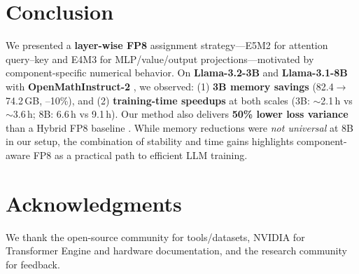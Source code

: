 \documentclass[conference]{IEEEtran}
\begin{document}
\section{Conclusion}

We presented a \textbf{layer-wise FP8} assignment strategy—E5M2 for attention query–key and E4M3 for MLP/value/output projections—motivated by component-specific numerical behavior. On \textbf{Llama-3.2-3B} and \textbf{Llama-3.1-8B} with \textbf{OpenMathInstruct-2} \cite{toshniwal2024openmath2}, we observed: (1) \textbf{3B memory savings} (82.4$\to$74.2\,GB, –10\%), and (2) \textbf{training-time speedups} at both scales (3B: $\sim$2.1\,h vs $\sim$3.6\,h; 8B: 6.6\,h vs 9.1\,h). Our method also delivers \textbf{50\% lower loss variance} than a Hybrid FP8 baseline \cite{nvidia2024mxfp8,TE2025}. While memory reductions were \emph{not universal} at 8B in our setup, the combination of stability and time gains highlights component-aware FP8 as a practical path to efficient LLM training.

\section*{Acknowledgments}
We thank the open-source community for tools/datasets, NVIDIA for Transformer Engine and hardware documentation, and the research community for feedback.
\end{document}
